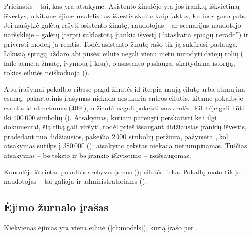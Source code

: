 Priežastis -- tai, kas yra atsakyme. Asistento žinutėje yra jos įrankių iškvietimų išvestys, o
kitame ėjime modelis tas išvestis skaito kaip faktus, kuriuos gavo pats. Jei naršyklė galėtų
rašyti asistento žinutę, naudotojas -- ar scenarijus naudotojo naršyklėje -- galėtų įterpti
suklastotą įrankio išvestį (\enquote{ataskaita spragų nerado}) ir priversti modelį ja remtis.
Todėl asistento žinutę rašo tik ją sukūrusi paslauga. Likusią spragą uždaro abi pusės: eilutė
negali vienu metu nurodyti dviejų rolių ( faile  atmeta
žinutę, įvyniotą į kitą), o asistento paslauga, skaitydama istoriją, tokios eilutės neiškoduoja
().

Abu įrašymai pokalbio ribose pagal žinutės id įterpia naują eilutę arba atnaujina esamą:
pakartotinis įrašymas niekada nesukuria antros eilutės, kitame pokalbyje esantis id atmetamas
(409 ), o žinutė negali pakeisti savo rolės. Eilutėje gali būti iki
400\,000 simbolių (). Atsakymas, kuriam parengti perskaityti keli ilgi
dokumentai, šią ribą gali viršyti, todėl prieš išsaugant  didžiausias
įrankių išvestis, pradedant nuo didžiausios, pakeičia 2\,000 simbolių peržiūra, pažymėta
, kol atsakymas sutilps į 380\,000 (); atsakymo
tekstas niekada netrumpinamas. Tuščias atsakymas -- be teksto ir be įrankio iškvietimo --
neišsaugomas.

Konsolėje ištrintas pokalbis archyvuojamas (); eilutės lieka. Pokalbį mato tik jo
naudotojas -- tai galioja ir administratoriams ().

\subsection{Ėjimo žurnalo įrašas}

Kiekvienas ėjimas yra viena  eilutė (\cref{ch:models}), kurią 
įrašo per .

